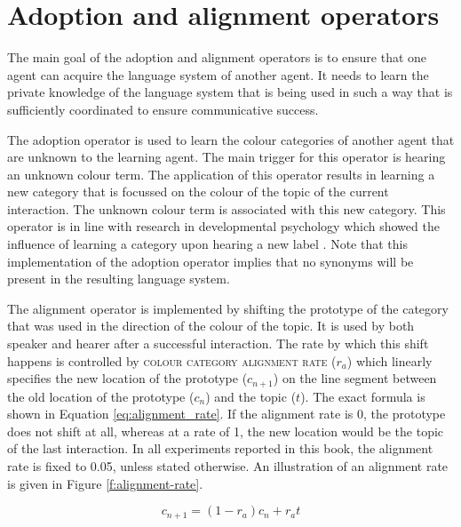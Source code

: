\section{Adoption and alignment operators}
\label{s:bcs-adoption-alignment-operators}

The main goal of the adoption and alignment operators is to ensure
that one agent can acquire the language system of another agent. It
needs to learn the private knowledge of the language system that is
being used in such a way that is sufficiently coordinated to ensure
communicative success.

The adoption operator
is used to learn the colour categories of
another agent that are unknown to the learning agent. The main trigger
for this operator is hearing an unknown colour term. The application
of this operator results in learning a new category that is focussed
on the colour of the topic of the current interaction. The unknown
colour term is associated with this new category. This operator is in
line with research in developmental psychology which showed the
influence of learning a category upon hearing a new label
\citep{xu02role}. Note that this implementation of the adoption
operator implies that no synonyms will be present in the resulting
language system.

The alignment operator is implemented by shifting the prototype of
the category that was used in the direction of the colour of the
topic. It is used by both speaker and hearer after a successful
interaction. The rate by which this shift happens is controlled by
\textsc{colour category alignment rate} 
($r_a$) which linearly specifies the new
location of the prototype ($c_{n+1}$) on the line segment between the
old location of the prototype ($c_n$) and the topic ($t$). The exact
formula is shown in Equation \ref{eq:alignment_rate}. If the alignment
rate is 0, the prototype does not shift at all, whereas at a rate of
1, the new location would be the topic of the last interaction. In all
experiments reported in this book, the alignment rate is fixed to
0.05, unless stated otherwise. An illustration of an alignment rate is
given in Figure \ref{f:alignment-rate}.

\begin{equation}
c_{n+1} = (1 - r_a) c_n  + r_a t
\label{eq:alignment_rate}
\end{equation}


